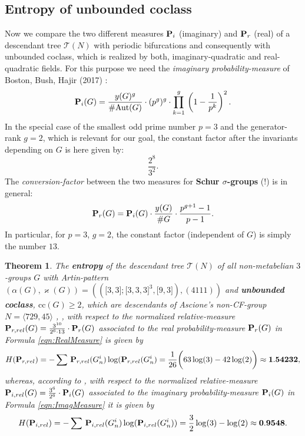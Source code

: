 \documentclass{amsart}
\newtheorem{theorem}{Theorem}[section]
\theoremstyle{definition}
\theoremstyle{remark}
\begin{document}
\subsection{Entropy of unbounded coclass}
\label{ss:UnboundedCoClass}
Now we compare the two different measures
\({\bf P}_i\) (imaginary) and \({\bf P}_r\) (real)
of a descendant tree
\(\mathcal{T}(N)\)
with periodic bifurcations and consequently with unbounded coclass,
which is realized by both, imaginary-quadratic and real-quadratic fields.
For this purpose we need the \textit{imaginary probability-measure} of Boston, Bush, Hajir (2017)
\cite{BBH2017}:
\begin{equation}
\label{eqn:ImagMeasure}
{\bf P}_i(G)=\frac{y(G)^{g}}{\#\mathrm{Aut}(G)}\cdot(p^g)^{g}\cdot\prod_{k=1}^{g}\,\left(1-\frac{1}{p^k}\right)^2.
\end{equation}
In the special case
of the smallest odd prime number \(p=3\)
and the generator-rank \(g=2\),
which is relevant for our goal,
the constant factor after the invariants depending on \(G\) is here given by:
\[\frac{2^8}{3^2}.\]
The \textit{conversion-factor} between the two measures for \textbf{Schur \(\sigma\)-groups} (!) is in general:
\begin{equation}
\label{eqn:Factor}
{\bf P}_r(G)={\bf P}_i(G)\cdot\frac{y(G)}{\#G}\cdot\frac{p^{g+1}-1}{p-1}.
\end{equation}
In particular, for \(p=3\), \(g=2\), the constant factor (independent of \(G\)) is simply the number \(13\).
\begin{theorem}
\label{thm:UnboundedCoClass}
The \textbf{entropy} of the descendant tree
\(\mathcal{T}(N)\)
of all non-metabelian \(3\)-groups \(G\) with Artin-pattern
\((\alpha(G),\varkappa(G))
=((\lbrack 3,3\rbrack;\lbrack 3,3,3\rbrack^3,\lbrack 9,3\rbrack),(4111))\)
and \textbf{unbounded coclass},
\(\mathrm{cc}(G)\ge 2\),
which are descendants of Ascione's non-CF-group
\(N=\langle 729,45\rangle\)
\cite{BaBu2007},
\cite{Ma2017},
with respect to the normalized relative-measure
\({\bf P}_{r,rel}(G)=\frac{3^{10}}{2^6\cdot 13}\cdot{\bf P}_{r}(G)\)
associated to the real probability-measure \({\bf P}_{r}(G)\) in Formula
\eqref{eqn:RealMeasure}
is given by
\begin{equation}
\label{eqn:EntropyReal}
H({\bf P}_{r,rel})
=-\sum\,{\bf P}_{r,rel}(G_n^i)\log({\bf P}_{r,rel}(G_n^i)
=\frac{1}{26}\biggl(63\log(3)-42\log(2)\biggr)
\approx{\bf 1.54232},
\end{equation}
whereas, according to
\cite{MMSM2026},
with respect to the normalized relative-measure
\({\bf P}_{i,rel}(G)=\frac{3^6}{2^6}\cdot{\bf P}_{i}(G)\)
associated to the imaginary probability-measure \({\bf P}_{i}(G)\) in Formula
\eqref{eqn:ImagMeasure}
it is given by
\begin{equation}
\label{eqn:EntropyImag}
H({\bf P}_{i,rel})
=-\sum\,{\bf P}_{i,rel}(G_n^i)\log({\bf P}_{i,rel}(G_n^i))
=\frac{3}{2}\log(3)-\log(2)
\approx{\bf 0.9548}.
\end{equation}
\end{theorem}
\end{document}
